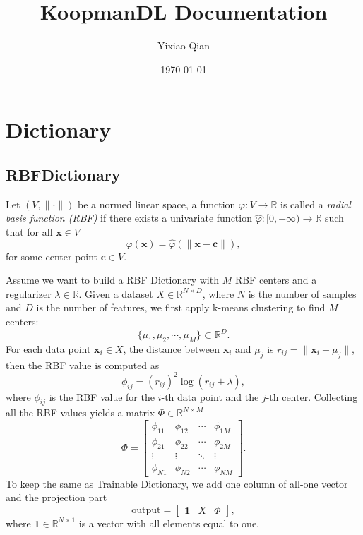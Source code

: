 \documentclass[en, bibend=bibtex]{elegantpaper}
\title{KoopmanDL Documentation}
\author{Yixiao Qian}
\institute{Zhejiang University}
\date{\today}
\theoremstyle{plain}
\begin{document}
\maketitle

\section{Dictionary}

\subsection{RBFDictionary}

\begin{definition}
  Let $(V, \|\cdot\|)$ be a normed linear space,
  a function $\varphi: V \rightarrow \mathbb{R}$ is called
  a \emph{radial basis function (RBF)} if
  there exists a univariate function $\hat{\varphi}: [0, +\infty) \rightarrow \mathbb{R}$
  such that for all $\mathbf{x} \in V$
  \begin{equation*}
   \varphi(\mathbf{x}) = \hat{\varphi}(\|\mathbf{x} - \mathbf{c}\|),
  \end{equation*}
  for some center point $\mathbf{c} \in V$.
\end{definition}

Assume we want to build a RBF Dictionary
with $M$ RBF centers and a regularizer $\lambda \in \mathbb{R}$.
Given a dataset $X \in \mathbb{R}^{N \times D}$,
where $N$ is the number of samples and
$D$ is the number of features,
we first apply k-means clustering to find $M$ centers:
\begin{equation*}
  \{\mu_1, \mu_2, \cdots, \mu_M\} \subset \mathbb{R}^D.
\end{equation*}
For each data point $\mathbf{x}_i \in X$,
the distance between $\mathbf{x}_i$ and $\mu_j$ is
$r_{ij} = \|\mathbf{x}_i - \mu_j\|$,
then the RBF value is computed as
\begin{equation*}
  \phi_{ij} = (r_{ij})^2 \log(r_{ij} + \lambda),
\end{equation*}
where $\phi_{ij}$ is the RBF value for the
$i$-th data point and the $j$-th center.
Collecting all the RBF values yields a matrix $\Phi \in \mathbb{R}^{N \times M}$
\begin{equation*}
  \Phi = \left[
    \begin{array}{cccc}
      \phi_{11}&\phi_{12}&\cdots&\phi_{1M}\\
      \phi_{21}&\phi_{22}&\cdots&\phi_{2M}\\
      \vdots & \vdots & \ddots & \vdots\\
      \phi_{N1}&\phi_{N2}&\cdots&\phi_{NM}
    \end{array}
  \right].
\end{equation*}
To keep the same as Trainable Dictionary,
we add one column of all-one vector and
the projection part
\begin{equation*}
  \text{output} = \left[
    \begin{array}{ccc}
      \mathbf{1}&X&\Phi
    \end{array}
  \right],
\end{equation*}
where $\mathbf{1} \in \mathbb{R}^{N\times 1}$ is a vector with all elements
equal to one.
\end{document}
